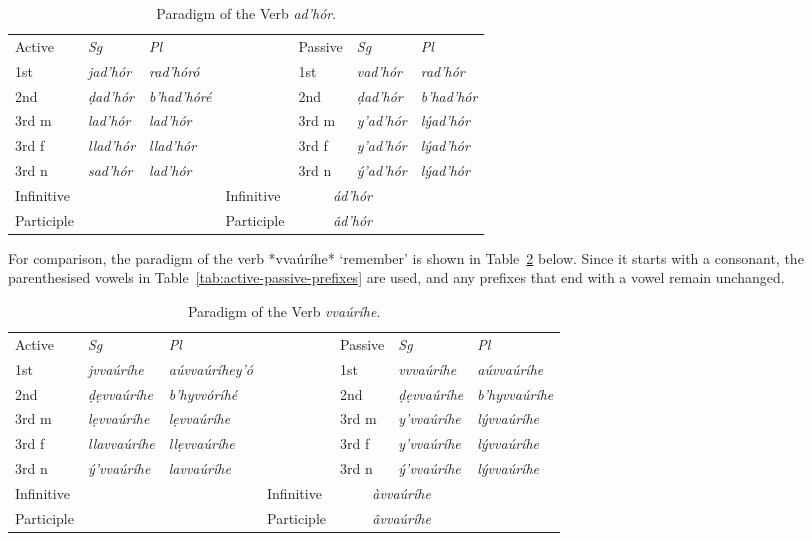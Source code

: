 \documentclass[a4paper, 12pt, oneside, final]{article}
\let \nf \normalfont
\def \d {ḍ}
\begin{document}
\begin{table}[H]
\centering
\noindent\begin{tabular}{@{}|>{}l|>{\it}l|>{\it}l|>{}l|>{}l|>{\it}l|>{\it}l|}\cline{1-3}\cline{5-7}
\nf Active&\nf Sg&\nf Pl&\nf &\nf Passive&\nf Sg&\nf Pl\\\cline{1-3}\cline{5-7}
1st&jad’hór&rad’hóró&&1st&vad’hór&rad’hór\\\cline{1-3}\cline{5-7}
2nd&\d{}ad’hór&b’had’hóré&&2nd&\d{}ad’hór&b’had’hór\\\cline{1-3}\cline{5-7}
3rd m&lad’hór&lad’hór&&3rd m&y’ad’hór&lýad’hór\\\cline{1-3}\cline{5-7}
3rd f&llad’hór&llad’hór&&3rd f&y’ad’hór &lýad’hór\\\cline{1-3}\cline{5-7}
3rd n&sad’hór&lad’hór&&3rd n&ý’ad’hór&lýad’hór\\\cline{1-3}\cline{5-7}
Infinitive&\multicolumn{2}{c|}{\it dad’hór}&&Infinitive&\multicolumn{2}{c|}{\it ád’hór}\\\cline{1-3}\cline{5-7}
Participle&\multicolumn{2}{c|}{\it ad’hórâ}&&Participle&\multicolumn{2}{c|}{\it âd’hór}\\\cline{1-3}\cline{5-7}
\end{tabular}
\caption{Paradigm of the Verb \emph{ad’hór}.}\label{tab:adhor-paradigm}
\end{table}

\noindent For comparison, the paradigm of the verb *vvaúríhe* ‘remember’ is shown in Table~\ref{tab:vvorihe-paradigm} below.
Since it starts with a consonant, the parenthesised vowels in Table~\ref{tab:active-passive-prefixes} are used, and any
prefixes that end with a vowel remain unchanged.

\begin{table}[H]
\centering
\noindent\begin{tabular}{@{}|>{}l|>{\it}l|>{\it}l|>{}l|>{}l|>{\it}l|>{\it}l|}\cline{1-3}\cline{5-7}
\nf Active&\nf Sg&\nf Pl&\nf &\nf Passive&\nf Sg&\nf Pl\\\cline{1-3}\cline{5-7}
1st&jvvaúríhe&aúvvaúríhey’ó&&1st&vvvaúríhe&aúvvaúríhe\\\cline{1-3}\cline{5-7}
2nd&ḍẹvvaúríhe&b’hyvvóríhé&&2nd&ḍẹvvaúríhe&b’hyvvaúríhe\\\cline{1-3}\cline{5-7}
3rd m&lẹvvaúríhe&lẹvvaúríhe&&3rd m&y’vvaúríhe&lývvaúríhe\\\cline{1-3}\cline{5-7}
3rd f&llavvaúríhe&llẹvvaúríhe&&3rd f&y’vvaúríhe&lývvaúríhe\\\cline{1-3}\cline{5-7}
3rd n&ý’vvaúríhe&lavvaúríhe&&3rd n&ý’vvaúríhe&lývvaúríhe\\\cline{1-3}\cline{5-7}
Infinitive&\multicolumn{2}{c|}{\it dẹvvaúríhe}&&Infinitive&\multicolumn{2}{c|}{\it àvvaúríhe}\\\cline{1-3}\cline{5-7}
Participle&\multicolumn{2}{c|}{\it vvaúríhê}&&Participle&\multicolumn{2}{c|}{\it âvvaúríhe}\\\cline{1-3}\cline{5-7}
\end{tabular}
\caption{Paradigm of the Verb \emph{vvaúríhe}.}\label{tab:vvorihe-paradigm}
\end{table}
\end{document}
